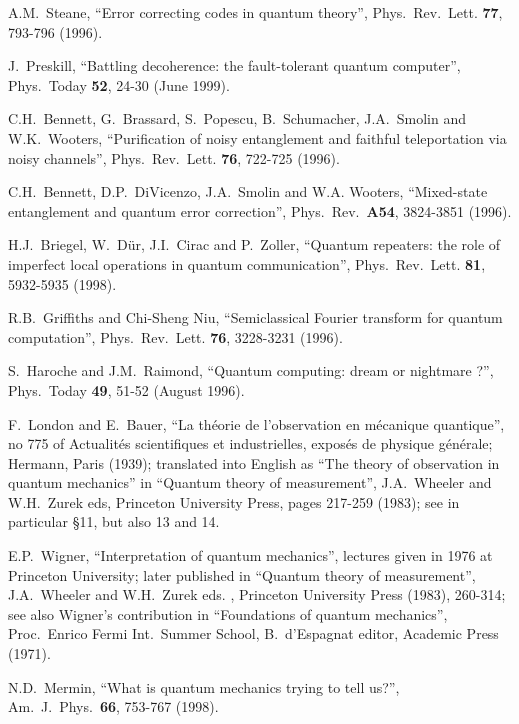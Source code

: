 \documentclass[12pt,onecolumn]{article}%
\begin{document}
\begin{thebibliography}{999}
A.M.\ Steane, ``Error correcting codes in quantum theory'',
Phys.\ Rev.\ Lett. \textbf{77}, 793-796 (1996).

J.\ Preskill, ``Battling decoherence: the fault-tolerant
quantum computer'', Phys.\ Today \textbf{52}, 24-30 (June 1999).

C.H.\ Bennett, G.\ Brassard, S.\ Popescu, B.\ Schumacher,
J.A.\ Smolin and W.K.\ Wooters, ``Purification of noisy entanglement and
faithful teleportation via noisy channels'', Phys.\ Rev.\ Lett. \textbf{76},
722-725 (1996).

C.H.\ Bennett, D.P.\ DiVicenzo, J.A.\ Smolin and W.A.
Wooters, ``Mixed-state entanglement and quantum error correction'',
Phys.\ Rev.\ \textbf{A54}, 3824-3851 (1996).

H.J.\ Briegel, W.\ D\"{u}r, J.I.\ Cirac and P.\ Zoller,
``Quantum repeaters: the role of imperfect local operations in quantum
communication'', Phys.\ Rev.\ Lett. \textbf{81}, 5932-5935 (1998).

R.B.\ Griffiths and Chi-Sheng Niu, ``Semiclassical
Fourier transform for quantum computation'', Phys.\ Rev.\ Lett. \textbf{76},
3228-3231 (1996).

S.\ Haroche and J.M.\ Raimond, ``Quantum computing: dream or
nightmare ?'', Phys.\ Today \textbf{49}, 51-52 (August 1996).

F.\ London and E.\ Bauer, ``La th\'{e}orie de
l'observation en m\'{e}canique quantique'', no 775 of Actualit\'{e}s
scientifiques et industrielles, expos\'{e}s de physique g\'{e}n\'{e}rale;
Hermann, Paris (1939); translated into English as ``The theory of observation
in quantum mechanics'' in ``Quantum theory of measurement'', J.A.\ Wheeler and
W.H.\ Zurek eds, Princeton University Press, pages 217-259 (1983); see in
particular \S 11, but also 13 and 14.

E.P.\ Wigner, ``Interpretation of quantum
mechanics'', lectures given in 1976 at Princeton University; later published
in ``Quantum theory of measurement'', J.A.\ Wheeler and W.H.\ Zurek eds. ,
Princeton University Press (1983), 260-314; see also Wigner's contribution in
``Foundations of quantum mechanics'', Proc.\ Enrico Fermi Int.\ Summer School,
B.\ d'Espagnat editor, Academic Press (1971).

N.D.\ Mermin, ``What is quantum mechanics trying to tell
us?'', Am.\ J.\ Phys.\ \textbf{66}, 753-767 (1998).


\end{thebibliography}
\end{document}
